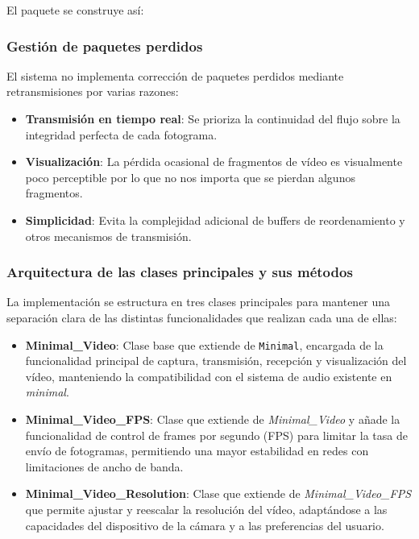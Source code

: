 \noindent
El paquete se construye así:
\begin{center}
\end{center}

\subsubsection{Gestión de paquetes perdidos}

El sistema no implementa corrección de paquetes perdidos mediante retransmisiones por varias razones:

\begin{itemize}
    \item \textbf{Transmisión en tiempo real}: Se prioriza la continuidad del flujo sobre la integridad perfecta de cada fotograma.
    \item \textbf{Visualización}: La pérdida ocasional de fragmentos de vídeo es visualmente poco perceptible por lo que no nos importa que se pierdan algunos fragmentos.
    \item \textbf{Simplicidad}: Evita la complejidad adicional de buffers de reordenamiento y otros mecanismos de transmisión.
\end{itemize}

\subsubsection{Arquitectura de las clases principales y sus métodos}

La implementación se estructura en tres clases principales para mantener una separación clara de las distintas funcionalidades que realizan cada una de ellas:

\begin{itemize}
    \item \textbf{Minimal\_Video}: Clase base que extiende de \texttt{Minimal}, encargada de la funcionalidad principal de captura, transmisión, recepción y visualización del vídeo, manteniendo la compatibilidad con el sistema de audio existente en \textit{minimal}.
    \item \textbf{Minimal\_Video\_FPS}: Clase que extiende de \textit{Minimal\_Video} y añade la funcionalidad de control de frames por segundo (FPS) para limitar la tasa de envío de fotogramas, permitiendo una mayor estabilidad en redes con limitaciones de ancho de banda.
    \item \textbf{Minimal\_Video\_Resolution}: Clase que extiende de \textit{Minimal\_Video\_FPS} que permite ajustar y reescalar la resolución del vídeo, adaptándose a las capacidades del dispositivo de la cámara y a las preferencias del usuario.
\end{itemize}
\vspace{\baselineskip}


